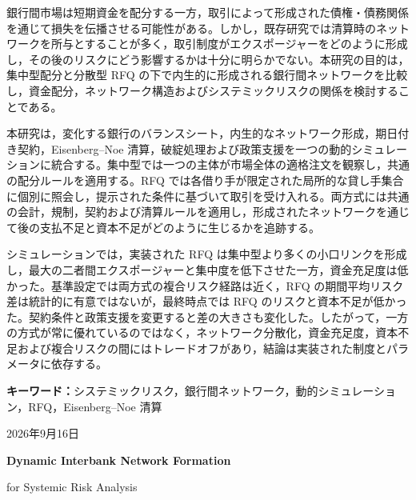{\fontsize{10.5pt}{17pt}\selectfont
銀行間市場は短期資金を配分する一方，取引によって形成された債権・債務関係を通じて損失を伝播させる可能性がある。しかし，既存研究では清算時のネットワークを所与とすることが多く，取引制度がエクスポージャーをどのように形成し，その後のリスクにどう影響するかは十分に明らかでない。本研究の目的は，集中型配分と分散型 RFQ の下で内生的に形成される銀行間ネットワークを比較し，資金配分，ネットワーク構造およびシステミックリスクの関係を検討することである。

本研究は，変化する銀行のバランスシート，内生的なネットワーク形成，期日付き契約，\mbox{Eisenberg--Noe} 清算，破綻処理および政策支援を一つの動的シミュレーションに統合する。集中型では一つの主体が市場全体の適格注文を観察し，共通の配分ルールを適用する。RFQ では各借り手が限定された局所的な貸し手集合に個別に照会し，提示された条件に基づいて取引を受け入れる。両方式には共通の会計，規制，契約および清算ルールを適用し，形成されたネットワークを通じて後の支払不足と資本不足がどのように生じるかを追跡する。

シミュレーションでは，実装された RFQ は集中型より多くの小口リンクを形成し，最大の二者間エクスポージャーと集中度を低下させた一方，資金充足度は低かった。基準設定では両方式の複合リスク経路は近く，RFQ の期間平均リスク差は統計的に有意ではないが，最終時点では RFQ のリスクと資本不足が低かった。契約条件と政策支援を変更すると差の大きさも変化した。したがって，一方の方式が常に優れているのではなく，ネットワーク分散化，資金充足度，資本不足および複合リスクの間にはトレードオフがあり，結論は実装された制度とパラメータに依存する。

\noindent\textbf{キーワード：}システミックリスク，銀行間ネットワーク，動的シミュレーション，RFQ，\mbox{Eisenberg--Noe} 清算
}

\vfill
\begin{flushright}
{\fontsize{10.5pt}{15pt}\selectfont 2026年9月16日}
\end{flushright}
\endgroup

\clearpage
\thispagestyle{plain}
{}

\begingroup
\setlength{\parindent}{1.5em}
\setlength{\parskip}{0pt}

\begin{center}
{\fontsize{18pt}{26pt}\selectfont\bfseries
Dynamic Interbank Network Formation\par
for Systemic Risk Analysis\par}
\end{center}

